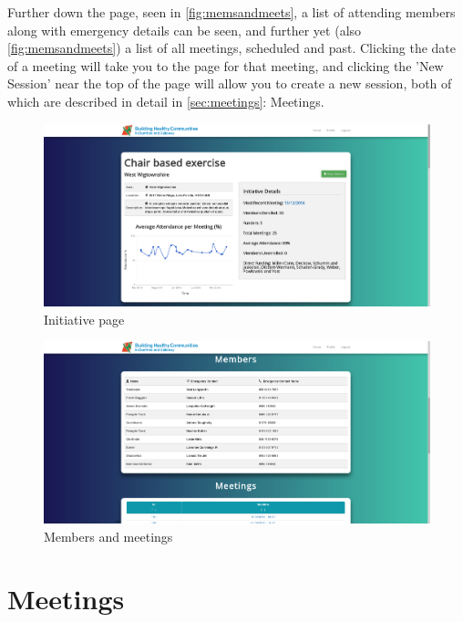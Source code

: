 \documentclass{bhcguides}
\begin{document}
 Further down the page, seen in \autoref{fig:memsandmeets}, a list of attending members along with emergency details can be seen, and further yet (also \autoref{fig:memsandmeets}) a list of all meetings, scheduled and past. Clicking the date of a meeting will take you to the page for that meeting, and clicking the 'New Session' near the top of the page will allow you to create a new session, both of which are described in detail in \autoref{sec:meetings}: Meetings.

\begin{figure}[h]
 \centerline{\includegraphics[width=\textwidth, height=\textheight, keepaspectratio]{initiativepage.png}}
 \caption{Initiative page}
 \label{fig:initiativePage}
\end{figure}

\begin{figure}[h]
 \centerline{\includegraphics[width=\textwidth, height=\textheight, keepaspectratio]{membersandmeetings.png}}
 \caption{Members and meetings}
 \label{fig:memsandmeets}
\end{figure}

\pagebreak

\section{Meetings}
\label{sec:meetings}
\end{document}
